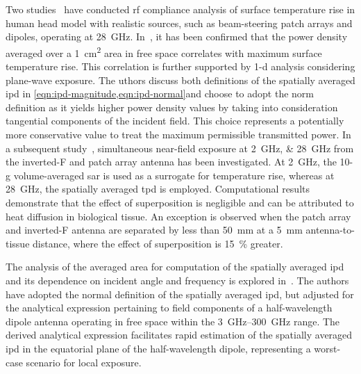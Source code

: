 Two studies~\cite{He2018RF,Miura2021Power} have conducted \gls{rf} compliance analysis of surface temperature rise in human head model with realistic sources, such as beam-steering patch arrays and dipoles, operating at \SI{28}{\GHz}.
In~\cite{He2018RF}, it has been confirmed that the power density averaged over a \SI{1}{\cm\squared} area in free space correlates with maximum surface temperature rise.
This correlation is further supported by \gls{1-d} analysis considering plane-wave exposure.
The uthors discuss both definitions of the spatially averaged \gls{ipd} in \cref{eqn:ipd-magnitude,eqn:ipd-normal}and choose to adopt the norm definition as it yields higher power density values by taking into consideration tangential components of the incident field.
This choice represents a potentially more conservative value to treat the maximum permissible transmitted power.
In a subsequent study~\cite{Miura2021Power}, simultaneous near-field exposure at \SIlist{2;28}{\GHz} from the inverted-F and patch array antenna has been investigated.
At \SI{2}{\GHz}, the 10-g volume-averaged \gls{sar} is used as a surrogate for temperature rise, whereas at \SI{28}{\GHz}, the spatially averaged \gls{tpd} is employed.
Computational results demonstrate that the effect of superposition is negligible and can be attributed to heat diffusion in biological tissue.
An exception is observed when the patch array and inverted-F antenna are separated by less than \SI{50}{\mm} at a \SI{5}{\mm} antenna-to-tissue distance, where the effect of superposition is \SI{15}{\percent} greater.

The analysis of the averaged area for computation of the spatially averaged \gls{ipd} and its dependence on incident angle and frequency is explored in~\cite{Poljak2020Assessment}.
The authors have adopted the normal definition of the spatially averaged \gls{ipd}, but adjusted for the analytical expression pertaining to field components of a half-wavelength dipole antenna operating in free space within the \SIrange{3}{300}{\GHz} range.
The derived analytical expression facilitates rapid estimation of the spatially averaged \gls{ipd} in the equatorial plane of the half-wavelength dipole, representing a worst-case scenario for local exposure.

